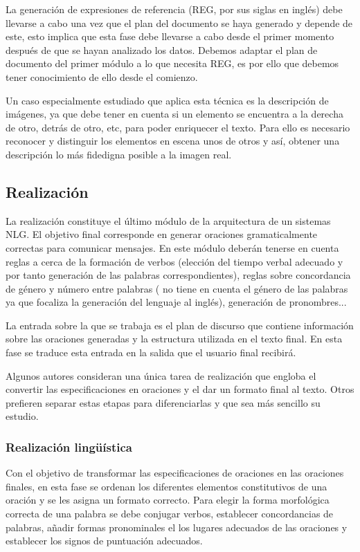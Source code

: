 La generación de expresiones de referencia (REG, por sus siglas en inglés) debe llevarse a cabo una vez que el plan del documento se haya generado y depende de este, esto implica que esta fase debe llevarse a cabo desde el primer momento después de que se hayan analizado los datos. Debemos adaptar el plan de documento del primer módulo a lo que necesita REG, es por ello que debemos tener conocimiento de ello desde el comienzo.

Un caso especialmente estudiado que aplica esta técnica es la descripción de imágenes, ya que debe tener en cuenta si un elemento se encuentra a la derecha de otro, detrás de otro, etc, para poder enriquecer el texto. Para ello es necesario reconocer y distinguir los elementos en escena unos de otros y así, obtener una descripción lo más fidedigna posible a la imagen real.

\subsection{Realización}
La realización constituye el último módulo de la arquitectura de un sistemas NLG. El objetivo final corresponde en generar oraciones gramaticalmente correctas para comunicar mensajes. En este módulo deberán tenerse en cuenta reglas a cerca de la formación de verbos (elección del tiempo verbal adecuado y por tanto generación de las palabras correspondientes), reglas sobre concordancia de género y número entre palabras (\cite{reiter1997building} no tiene en cuenta el género de las palabras ya que focaliza la generación del lenguaje al inglés), generación de pronombres...
 
La entrada sobre la que se trabaja es el plan de discurso que contiene información sobre las oraciones generadas y la estructura utilizada en el texto final. En esta fase se traduce esta entrada en la salida que el usuario final recibirá.

Algunos autores consideran una única tarea de realización que engloba el convertir las especificaciones en oraciones y el dar un formato final al texto. Otros prefieren separar estas etapas para diferenciarlas y que sea más sencillo su estudio.

\subsubsection{Realización lingüística}
Con el objetivo de transformar las especificaciones de oraciones en las oraciones finales, en esta fase se ordenan los diferentes elementos constitutivos de una oración y se les asigna un formato correcto. Para elegir la forma morfológica correcta de una palabra se debe conjugar verbos, establecer concordancias de palabras, añadir formas pronominales el los lugares adecuados de las oraciones y establecer los signos de puntuación adecuados. 

